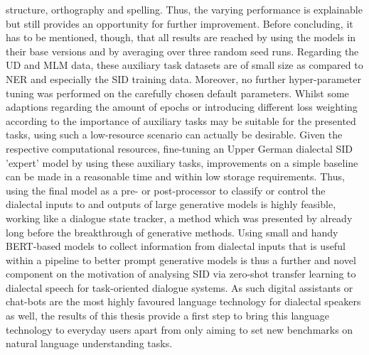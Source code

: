 \documentclass[11pt,a4paper,twoside,openright]{scrbook}
\begin{document}
structure, orthography and spelling. Thus, the varying performance is explainable but still provides an opportunity for further improvement. Before concluding, it has to be mentioned, though, that all results are reached by using the models in their base versions and by averaging over three random seed runs. Regarding the UD and MLM data, these auxiliary task datasets are of small size as compared to NER and especially the SID training data. Moreover, no further hyper-parameter tuning was performed on the carefully chosen default parameters. Whilst some adaptions regarding the amount of epochs or introducing different loss weighting according to the importance of auxiliary tasks may be suitable for the presented tasks, using such a low-resource scenario can actually be desirable. Given the respective computational resources, fine-tuning an Upper German dialectal SID 'expert' model by using these auxiliary tasks, improvements on a simple baseline can be made in a reasonable time and within low storage requirements. Thus, using the final model as a pre- or post-processor to classify or control the dialectal inputs to and outputs of large generative models is highly feasible, working like a dialogue state tracker, a method which was presented by \citet{mrksic-etal-2017-neural} already long before the breakthrough of generative methods. Using small and handy BERT-based models to collect information from dialectal inputs that is useful within a pipeline to better prompt generative models is thus a further and novel component on the motivation of analysing SID via zero-shot transfer learning to dialectal speech for task-oriented dialogue systems. As such digital assistants or chat-bots are the most highly favoured language technology for dialectal speakers as well, the results of this thesis provide a first step to bring this language technology to everyday users apart from only aiming to set new benchmarks on natural language understanding tasks. 






\newpage






\end{document}
